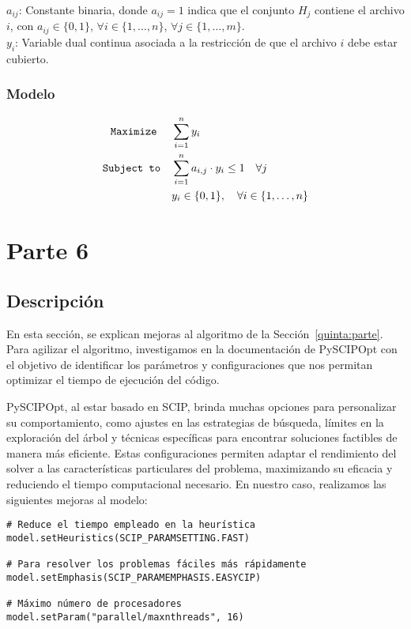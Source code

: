 \documentclass[11pt, a4paper, pdftex]{article}
\begin{document}
\noindent $a_{ij}$: Constante binaria, donde $a_{ij} = 1$ indica que el conjunto $H_{j}$ contiene el archivo $i$, con $a_{ij} \in \{0, 1\}$, $\forall i \in \{1, \ldots, n\}$, $\forall j \in \{1, \ldots, m\}$. \\

\noindent $y_{i}$:  Variable dual continua asociada a la restricción de que el archivo $i$ debe estar cubierto.

\subsubsection{Modelo}

\begin{alignat*}{2}
    \texttt{Maximize}\quad\,\, & \sum_{i = 1}^{n} y_{i}\\
    \texttt{Subject to}\quad   & \sum_{i=1}^{n} a_{i,j} \cdot y_{i} \leq 1 \quad \forall j\\
              & y_{i} \in \{0,1\}, \quad \forall i \in \{1, \ldots, n\} \\
\end{alignat*}

\newpage
\section{Parte 6}

\subsection{Descripción}

En esta sección, se explican mejoras al algoritmo de la
Sección~\ref{quinta:parte}. Para agilizar el algoritmo, investigamos en la
documentación de PySCIPOpt con el objetivo de identificar los parámetros y
configuraciones que nos permitan optimizar el tiempo de ejecución del
código.

PySCIPOpt, al estar basado en SCIP, brinda muchas opciones para
personalizar su comportamiento, como ajustes en las estrategias de
búsqueda, límites en la exploración del árbol y técnicas específicas
para encontrar soluciones factibles de manera más eficiente. Estas
configuraciones permiten adaptar el rendimiento del solver a las
características particulares del problema, maximizando su eficacia y
reduciendo el tiempo computacional necesario. En nuestro caso,
realizamos las siguientes mejoras al modelo:

\begin{verbatim}
# Reduce el tiempo empleado en la heurística
model.setHeuristics(SCIP_PARAMSETTING.FAST)

# Para resolver los problemas fáciles más rápidamente
model.setEmphasis(SCIP_PARAMEMPHASIS.EASYCIP)

# Máximo número de procesadores
model.setParam("parallel/maxnthreads", 16)
\end{verbatim}
\end{document}
